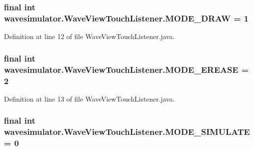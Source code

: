 \subsubsection[{\texorpdfstring{M\+O\+D\+E\+\_\+\+D\+R\+AW}{MODE_DRAW}}]{\setlength{\rightskip}{0pt plus 5cm}final int wavesimulator.\+Wave\+View\+Touch\+Listener.\+M\+O\+D\+E\+\_\+\+D\+R\+AW = 1\hspace{0.3cm}{\ttfamily [static]}}\hypertarget{classwavesimulator_1_1WaveViewTouchListener_a43b9a5b29cc916665f118e4eb02ea0cd}{}\label{classwavesimulator_1_1WaveViewTouchListener_a43b9a5b29cc916665f118e4eb02ea0cd}


Definition at line 12 of file Wave\+View\+Touch\+Listener.\+java.

\subsubsection[{\texorpdfstring{M\+O\+D\+E\+\_\+\+E\+R\+E\+A\+SE}{MODE_EREASE}}]{\setlength{\rightskip}{0pt plus 5cm}final int wavesimulator.\+Wave\+View\+Touch\+Listener.\+M\+O\+D\+E\+\_\+\+E\+R\+E\+A\+SE = 2\hspace{0.3cm}{\ttfamily [static]}}\hypertarget{classwavesimulator_1_1WaveViewTouchListener_a362216c62634446ed74cf63bb09dfcfa}{}\label{classwavesimulator_1_1WaveViewTouchListener_a362216c62634446ed74cf63bb09dfcfa}


Definition at line 13 of file Wave\+View\+Touch\+Listener.\+java.

\subsubsection[{\texorpdfstring{M\+O\+D\+E\+\_\+\+S\+I\+M\+U\+L\+A\+TE}{MODE_SIMULATE}}]{\setlength{\rightskip}{0pt plus 5cm}final int wavesimulator.\+Wave\+View\+Touch\+Listener.\+M\+O\+D\+E\+\_\+\+S\+I\+M\+U\+L\+A\+TE = 0\hspace{0.3cm}{\ttfamily [static]}}\hypertarget{classwavesimulator_1_1WaveViewTouchListener_a1d1220dca35324db02e3ac953db358ec}{}\label{classwavesimulator_1_1WaveViewTouchListener_a1d1220dca35324db02e3ac953db358ec}


